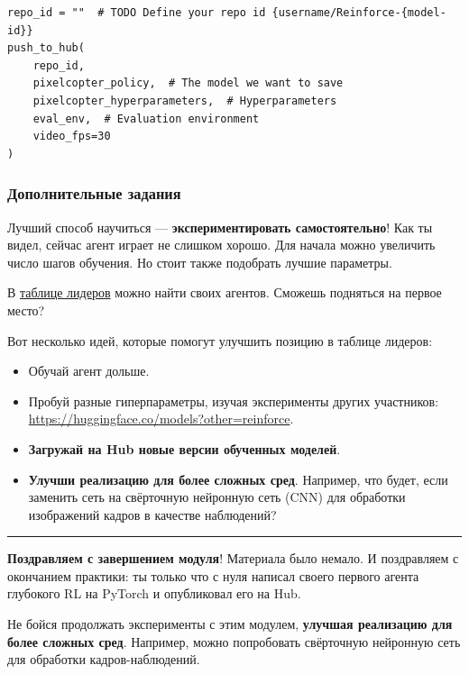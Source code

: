 \documentclass[11pt,a4paper]{article}
\begin{document}
\begin{lstlisting}
repo_id = ""  # TODO Define your repo id {username/Reinforce-{model-id}}
push_to_hub(
    repo_id,
    pixelcopter_policy,  # The model we want to save
    pixelcopter_hyperparameters,  # Hyperparameters
    eval_env,  # Evaluation environment
    video_fps=30
)
\end{lstlisting}

\subsubsection{Дополнительные задания}\label{some-additional-challenges}

Лучший способ научиться --- \textbf{экспериментировать самостоятельно}! Как ты видел, сейчас агент играет не слишком хорошо. Для начала можно увеличить число шагов обучения. Но стоит также подобрать лучшие параметры.

В \href{https://huggingface.co/spaces/huggingface-projects/Deep-Reinforcement-Learning-Leaderboard}{таблице лидеров} можно найти своих агентов. Сможешь подняться на первое место?

Вот несколько идей, которые помогут улучшить позицию в таблице лидеров:

\begin{itemize}
\tightlist
\item
  Обучай агент дольше.
\item
  Пробуй разные гиперпараметры, изучая эксперименты других участников: \url{https://huggingface.co/models?other=reinforce}.
\item
  \textbf{Загружай на Hub новые версии обученных моделей}.
\item
  \textbf{Улучши реализацию для более сложных сред}. Например, что будет, если заменить сеть на свёрточную нейронную сеть (CNN) для обработки изображений кадров в качестве наблюдений?
\end{itemize}

\begin{center}\rule{0.5\linewidth}{0.5pt}\end{center}

\textbf{Поздравляем с завершением модуля}! Материала было немало. И поздравляем с окончанием практики: ты только что с нуля написал своего первого агента глубокого RL на PyTorch и опубликовал его на Hub.

Не бойся продолжать эксперименты с этим модулем, \textbf{улучшая реализацию для более сложных сред}. Например, можно попробовать свёрточную нейронную сеть для обработки кадров-наблюдений.
\end{document}
